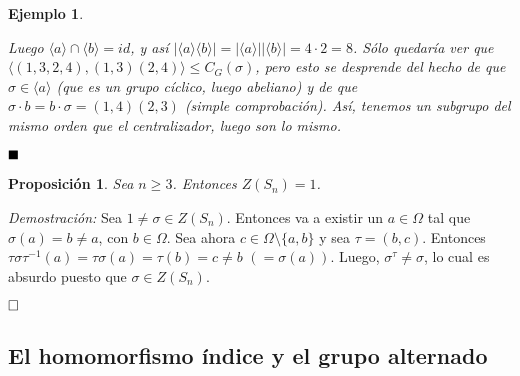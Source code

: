 \documentclass[12pt]{article}
\newtheorem{proposition}[theorem]{Proposición}
\newtheorem{example}{Ejemplo}[theorem]
\begin{document}
\begin{example}
\begin{enumerate}
Luego $\langle a \rangle \cap \langle b \rangle = id$, y así $|\langle a \rangle \langle b \rangle | = |\langle a \rangle| |\langle b \rangle| = 4\cdot 2 = 8$. Sólo quedaría ver que $\langle (1,3,2,4),(1,3)(2,4)\rangle \leq C_{G}(\sigma)$, pero esto se desprende del hecho de que $\sigma \in \langle a \rangle$ (que es un grupo cíclico, luego abeliano) y de que $\sigma \cdot b = b \cdot \sigma = (1,4)(2,3)$ (simple comprobación). Así, tenemos un subgrupo del mismo orden que el centralizador, luego son lo mismo.
\end{enumerate}
\end{example}

$\hfill \blacksquare$

\begin{proposition} Sea $n \geq 3$. Entonces $Z(S_{n}) =1$.
\end{proposition}
\emph{Demostración: }
Sea $1 \neq \sigma \in Z(S_{n})$. Entonces va a existir un $a \in \Omega$ tal que $\sigma (a)= b \neq a$, con $b \in \Omega$. Sea ahora $c \in \Omega \setminus \lbrace a,b \rbrace$ y sea $\tau =(b,c)$. Entonces $\tau\sigma \tau^{-1} (a)= \tau \sigma (a) =\tau (b) = c \neq b$ $(=\sigma(a))$. Luego, $\sigma^{\tau} \neq \sigma$, lo cual es absurdo puesto que $\sigma \in Z(S_{n})$.

$\hfill \square$

\subsection{El homomorfismo índice y el grupo alternado}
\end{document}
